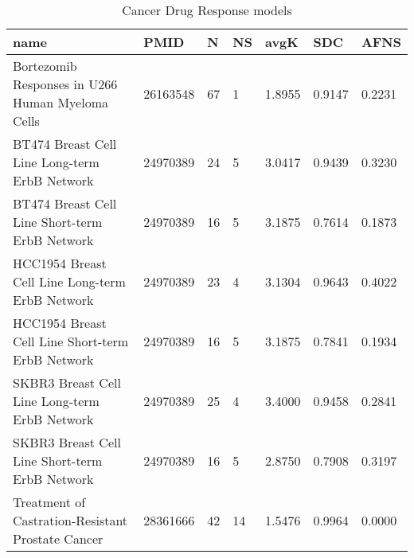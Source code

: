 \begin{table}
\centering
\caption{Cancer Drug Response models}
\label{tab:Cancer_Drug_Response}
\begin{tabular}{|p{180pt}||p{40pt}|p{25pt}|p{25pt}|p{40pt}|p{25pt}|p{25pt}|}
\toprule
 name & PMID &N &NS & avgK &SDC & AFNS \\
\midrule
Bortezomib Responses in U266 Human Myeloma Cells & 26163548 & 67 & 1 & 1.8955 & 0.9147 & 0.2231 \\
BT474 Breast Cell Line Long-term ErbB Network & 24970389 & 24 & 5 & 3.0417 & 0.9439 & 0.3230 \\
BT474 Breast Cell Line Short-term ErbB Network & 24970389 & 16 & 5 & 3.1875 & 0.7614 & 0.1873 \\
HCC1954 Breast Cell Line Long-term ErbB Network & 24970389 & 23 & 4 & 3.1304 & 0.9643 & 0.4022 \\
HCC1954 Breast Cell Line Short-term ErbB Network & 24970389 & 16 & 5 & 3.1875 & 0.7841 & 0.1934 \\
SKBR3 Breast Cell Line Long-term ErbB Network & 24970389 & 25 & 4 & 3.4000 & 0.9458 & 0.2841 \\
SKBR3 Breast Cell Line Short-term ErbB Network & 24970389 & 16 & 5 & 2.8750 & 0.7908 & 0.3197 \\
Treatment of Castration-Resistant Prostate Cancer & 28361666 & 42 &14 & 1.5476 & 0.9964 & 0.0000 \\
\bottomrule
\end{tabular}
\end{table}
